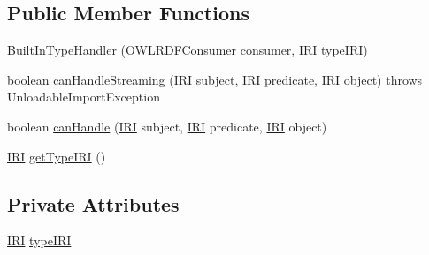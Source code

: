\subsection*{Public Member Functions}
\begin{DoxyCompactItemize}
\item 
\hyperlink{classorg_1_1coode_1_1owlapi_1_1rdfxml_1_1parser_1_1_built_in_type_handler_a41e4bc0e78f5e598c362ff1a3256b2b1}{Built\-In\-Type\-Handler} (\hyperlink{classorg_1_1coode_1_1owlapi_1_1rdfxml_1_1parser_1_1_o_w_l_r_d_f_consumer}{O\-W\-L\-R\-D\-F\-Consumer} \hyperlink{classorg_1_1coode_1_1owlapi_1_1rdfxml_1_1parser_1_1_abstract_triple_handler_a4ccf4d898ff01eb1cadfa04b23d54e9c}{consumer}, \hyperlink{classorg_1_1semanticweb_1_1owlapi_1_1model_1_1_i_r_i}{I\-R\-I} \hyperlink{classorg_1_1coode_1_1owlapi_1_1rdfxml_1_1parser_1_1_built_in_type_handler_a6f580abb966254d212847c1cd2f5d71c}{type\-I\-R\-I})
\item 
boolean \hyperlink{classorg_1_1coode_1_1owlapi_1_1rdfxml_1_1parser_1_1_built_in_type_handler_ab44f05ceda0a5829c152fc0cf3f247a1}{can\-Handle\-Streaming} (\hyperlink{classorg_1_1semanticweb_1_1owlapi_1_1model_1_1_i_r_i}{I\-R\-I} subject, \hyperlink{classorg_1_1semanticweb_1_1owlapi_1_1model_1_1_i_r_i}{I\-R\-I} predicate, \hyperlink{classorg_1_1semanticweb_1_1owlapi_1_1model_1_1_i_r_i}{I\-R\-I} object)  throws Unloadable\-Import\-Exception
\item 
boolean \hyperlink{classorg_1_1coode_1_1owlapi_1_1rdfxml_1_1parser_1_1_built_in_type_handler_a05dc111f764f9f5622eb0c32f78982c4}{can\-Handle} (\hyperlink{classorg_1_1semanticweb_1_1owlapi_1_1model_1_1_i_r_i}{I\-R\-I} subject, \hyperlink{classorg_1_1semanticweb_1_1owlapi_1_1model_1_1_i_r_i}{I\-R\-I} predicate, \hyperlink{classorg_1_1semanticweb_1_1owlapi_1_1model_1_1_i_r_i}{I\-R\-I} object)
\item 
\hyperlink{classorg_1_1semanticweb_1_1owlapi_1_1model_1_1_i_r_i}{I\-R\-I} \hyperlink{classorg_1_1coode_1_1owlapi_1_1rdfxml_1_1parser_1_1_built_in_type_handler_a5a75787055673f0b2760ff52115b60db}{get\-Type\-I\-R\-I} ()
\end{DoxyCompactItemize}
\subsection*{Private Attributes}
\begin{DoxyCompactItemize}
\item 
\hyperlink{classorg_1_1semanticweb_1_1owlapi_1_1model_1_1_i_r_i}{I\-R\-I} \hyperlink{classorg_1_1coode_1_1owlapi_1_1rdfxml_1_1parser_1_1_built_in_type_handler_a6f580abb966254d212847c1cd2f5d71c}{type\-I\-R\-I}
\end{DoxyCompactItemize}
